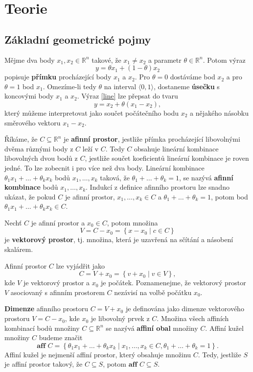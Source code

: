 \part{Teorie}

\chapter{Základní geometrické pojmy}

Mějme dva body $x_1, x_2 \in \mathbb{R}^n$ takové, že $x_1 \neq x_2$ a parametr $\theta \in \mathbb{R}^n$. Potom výraz
\begin{equation}
    y = \theta x_1 + (1 - \theta) x_2
    \label{line}
\end{equation}
popisuje \textbf{přímku} procházející body $x_1$ a $x_2$. Pro $\theta = 0$ dostáváme bod $x_2$ a pro $\theta = 1$ bod $x_1$. Omezíme-li tedy $\theta$ na interval $\langle 0, 1 \rangle$, dostaneme \textbf{úsečku} s koncovými body $x_1$ a $x_2$. Výraz \ref{line} lze přepsat do tvaru
$$
    y = x_2 + \theta (x_1 - x_2),
$$
který můžeme interpretovat jako součet počátečního bodu $x_2$ a nějakého násobku směrového vektoru $x_1 - x_2$.

\noindent Říkáme, že $C \subseteq \mathbb{R}^n$ je \textbf{afinní prostor}, jestliže přímka procházející libovolnými dvěma různými body z $C$ leží v $C$. Tedy $C$ obsahuje lineární kombinace libovolných dvou bodů z $C$, jestliže součet koeficientů lineární kombinace je roven jedné. To lze zobecnit i pro více než dva body. Lineární kombinace $\theta_1 x_1 + \dots + \theta_k x_k$ bodů $x_1, \dots, x_k$ taková, že $\theta_1 + \dots + \theta_k = 1$, se nazývá \textbf{afinní kombinace} bodů $x_1, \dots, x_k$. Indukcí z definice afinního prostoru lze snadno ukázat, že pokud $C$ je afinní prostor, $x_1, \dots, x_k \in C$ a $\theta_1 + \dots + \theta_k = 1$, potom bod $\theta_1 x_1 + \dots + \theta_k x_k \in C$.

\noindent Nechť $C$ je afinní prostor a $x_0 \in C$, potom množina
$$
    V = C - x_0 = \left\{ x - x_0 \mid c \in C \right\}
$$
je \textbf{vektorový prostor}, tj. množina, která je uzavřená na sčítání a násobení skalárem.

\noindent Afinní prostor $C$ lze vyjádřit jako
$$
    C = V + x_0 = \left\{ v + x_0 \mid v \in V \right\},
$$
kde $V$ je vektorový prostor a $x_0$ je počátek. Poznamenejme, že vektorový prostor $V$ asociovaný s afinním prostorem $C$ nezávisí na volbě počátku $x_0$.

\noindent \textbf{Dimenze} afinního prostoru $C = V + x_0$ je definována jako dimenze vektorového prostoru $V = C - x_0$, kde $x_0$ je libovolný prvek z $C$. Množina všech affiních kombinací bodů množiny $C \subseteq \mathbb{R}^n$ se nazývá \textbf{affiní obal} množiny $C$. Affiní kužel množiny $C$ budeme značit
$$
    \textbf{aff } C = \left\{ \theta_1 x_1 + \dots + \theta_k x_k \mid x_1, \dots, x_k \in C, \theta_1 + \dots + \theta_k = 1 \right\}.
$$
Affiní kužel je nejmenší affiní prostor, který obsahuje množinu $C$. Tedy, jestliže $S$ je affiní prostor takový, že $C \subseteq S$, potom $\textbf{aff }C \subseteq S$.


